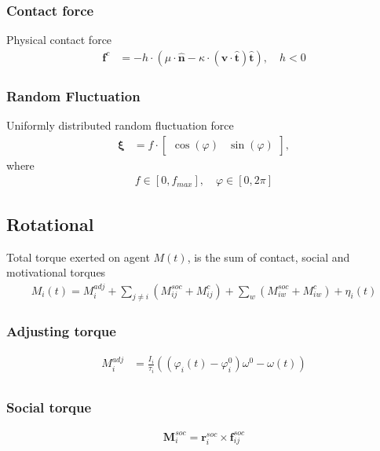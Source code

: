 \subsubsection{Contact force}
Physical contact force
\begin{align}
\mathbf{f}^{c} &= - h \cdot \left(\mu \cdot \hat{\mathbf{n}} - \kappa \cdot (\mathbf{v} \cdot \hat{\mathbf{t}}) \hat{\mathbf{t}}\right), \quad h < 0
\end{align}


\subsubsection{Random Fluctuation}
Uniformly distributed random fluctuation force
\begin{align}
\boldsymbol{\xi} &= f \cdot \begin{bmatrix} \cos(\varphi) & \sin(\varphi) \end{bmatrix},
\end{align}
where
\begin{align}
f \in [0, f_{max}],\quad \varphi \in [0, 2 \pi]
\end{align}


\subsection{Rotational}
Total torque exerted on agent $ M(t) $, is the sum of contact, social and motivational torques
\begin{align}
M_{i}(t) = M_{i}^{adj} + \sum_{j\neq i}^{} \left(M_{ij}^{soc} + M_{ij}^{c}\right) + \sum_{w}^{} \left(M_{iw}^{soc} + M_{iw}^{c}\right) + \eta_{i}(t)
\end{align}


\subsubsection{Adjusting torque}
\begin{align}
M_{i}^{adj} &= \frac{I_{i}}{\tau_{i}} \left((\varphi_{i}(t) - \varphi_{i}^{0}) \omega^{0} - \omega(t)\right) \\
\end{align}

\subsubsection{Social torque}
\begin{align}
\mathbf{M}_{i}^{soc} = \mathbf{r}_{i}^{soc} \times \mathbf{f}_{ij}^{soc}
\end{align}

